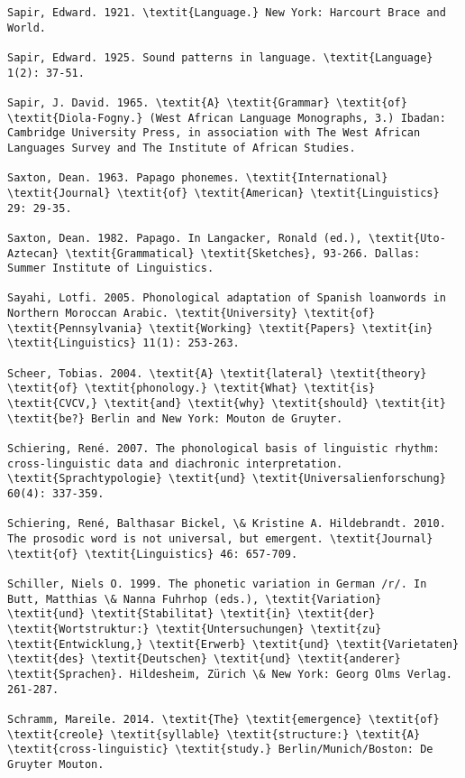 \begin{verbatim}
Sapir, Edward. 1921. \textit{Language.} New York: Harcourt Brace and World.

Sapir, Edward. 1925. Sound patterns in language. \textit{Language} 1(2): 37-51.

Sapir, J. David. 1965. \textit{A} \textit{Grammar} \textit{of} \textit{Diola-Fogny.} (West African Language Monographs, 3.) Ibadan: Cambridge University Press, in association with The West African Languages Survey and The Institute of African Studies.

Saxton, Dean. 1963. Papago phonemes. \textit{International} \textit{Journal} \textit{of} \textit{American} \textit{Linguistics} 29: 29-35.

Saxton, Dean. 1982. Papago. In Langacker, Ronald (ed.), \textit{Uto-Aztecan} \textit{Grammatical} \textit{Sketches}, 93-266. Dallas: Summer Institute of Linguistics.

Sayahi, Lotfi. 2005. Phonological adaptation of Spanish loanwords in Northern Moroccan Arabic. \textit{University} \textit{of} \textit{Pennsylvania} \textit{Working} \textit{Papers} \textit{in} \textit{Linguistics} 11(1): 253-263.

Scheer, Tobias. 2004. \textit{A} \textit{lateral} \textit{theory} \textit{of} \textit{phonology.} \textit{What} \textit{is} \textit{CVCV,} \textit{and} \textit{why} \textit{should} \textit{it} \textit{be?} Berlin and New York: Mouton de Gruyter.

Schiering, René. 2007. The phonological basis of linguistic rhythm: cross-linguistic data and diachronic interpretation. \textit{Sprachtypologie} \textit{und} \textit{Universalienforschung} 60(4): 337-359.

Schiering, René, Balthasar Bickel, \& Kristine A. Hildebrandt. 2010. The prosodic word is not universal, but emergent. \textit{Journal} \textit{of} \textit{Linguistics} 46: 657-709.

Schiller, Niels O. 1999. The phonetic variation in German /r/. In Butt, Matthias \& Nanna Fuhrhop (eds.), \textit{Variation} \textit{und} \textit{Stabilitat} \textit{in} \textit{der} \textit{Wortstruktur:} \textit{Untersuchungen} \textit{zu} \textit{Entwicklung,} \textit{Erwerb} \textit{und} \textit{Varietaten} \textit{des} \textit{Deutschen} \textit{und} \textit{anderer} \textit{Sprachen}. Hildesheim, Zürich \& New York: Georg Olms Verlag. 261-287.

Schramm, Mareile. 2014. \textit{The} \textit{emergence} \textit{of} \textit{creole} \textit{syllable} \textit{structure:} \textit{A} \textit{cross-linguistic} \textit{study.} Berlin/Munich/Boston: De Gruyter Mouton.


\end{verbatim}
